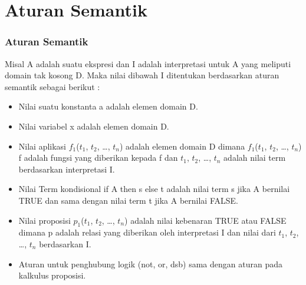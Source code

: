 \documentclass[handout]{beamer}
\theoremstyle{definition}
\theoremstyle{example}
\begin{document}
\section{Aturan Semantik}
\begin{frame}
	\frametitle{Aturan Semantik}
	Misal A adalah suatu ekspresi dan I adalah interpretasi untuk A yang meliputi domain tak kosong D. Maka nilai dibawah I ditentukan berdasarkan aturan semantik sebagai berikut :\\
	\begin{itemize}
		\item Nilai suatu konstanta a adalah elemen domain D.
		\item Nilai variabel x adalah elemen domain D.
		\item Nilai aplikasi $f_1$($t_1$, $t_2$, …, $t_n$) adalah elemen domain D dimana $f_1$($t_1$, $t_2$, …, $t_n$) f adalah fungsi yang diberikan kepada f dan $t_1$, $t_2$, …, $t_n$ adalah nilai term berdasarkan interpretasi I.
		\item Nilai Term kondisional if A then s else t adalah nilai term s jika A bernilai TRUE dan sama dengan nilai term t jika A bernilai FALSE.
		\item Nilai proposisi $p_1$($t_1$, $t_2$, …, $t_n$) adalah nilai kebenaran TRUE atau FALSE dimana p adalah relasi yang diberikan oleh interpretasi I dan nilai dari $t_1$, $t_2$, …, $t_n$ berdasarkan I.
		\item Aturan untuk penghubung logik (not, or, dsb) sama dengan aturan pada kalkulus proposisi.
	\end{itemize}	
\end{frame}	
\end{document}
